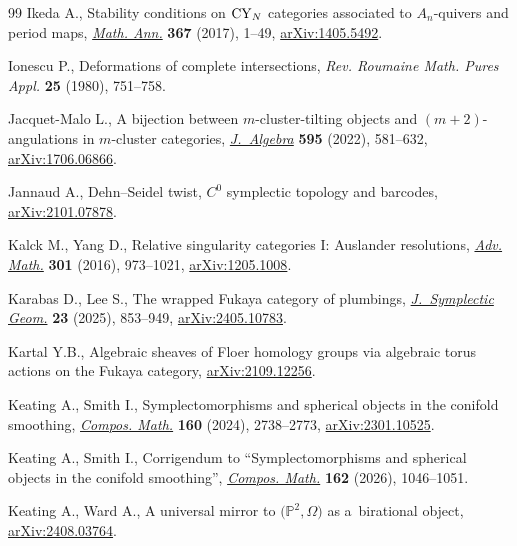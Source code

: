 \documentclass[10pt,a4paper]{amsart}
\theoremstyle{definition}
\numberwithin{equation}{section}
\begin{document}
\begin{thebibliography}{99}
Ikeda A., Stability conditions on {${\rm CY}_N$} categories associated to
 {$A_n$}-quivers and period maps,
 \href{https://doi.org/10.1007/s00208-016-1375-4}{\textit{Math. Ann.}}
 \textbf{367} (2017), 1--49,
 \href{http://arxiv.org/abs/1405.5492}{arXiv:1405.5492}.

Ionescu P., Deformations of complete intersections, \textit{Rev. Roumaine Math.
 Pures Appl.} \textbf{25} (1980), 751--758.

Jacquet-Malo L., A bijection between {$m$}-cluster-tilting objects and
 {$(m+2)$}-angulations in {$m$}-cluster categories,
 \href{https://doi.org/10.1016/j.jalgebra.2021.11.041}{\textit{J.~Algebra}}
 \textbf{595} (2022), 581--632,
 \href{http://arxiv.org/abs/1706.06866}{arXiv:1706.06866}.

Jannaud A., Dehn--{S}eidel twist, ${C}^0$ symplectic topology and barcodes,
 \href{http://arxiv.org/abs/2101.07878}{arXiv:2101.07878}.

Kalck M., Yang D., Relative singularity categories {I}: {A}uslander
 resolutions, \href{https://doi.org/10.1016/j.aim.2016.06.011}{\textit{Adv.
 Math.}} \textbf{301} (2016), 973--1021,
 \href{http://arxiv.org/abs/1205.1008}{arXiv:1205.1008}.

Karabas D., Lee S., The wrapped {F}ukaya category of plumbings,
 \href{https://doi.org/10.4310/jsg.250820172316}{\textit{J.~Symplectic Geom.}}
 \textbf{23} (2025), 853--949,
 \href{http://arxiv.org/abs/2405.10783}{arXiv:2405.10783}.

Kartal Y.B., Algebraic sheaves of {F}loer homology groups via algebraic torus
 actions on the {F}ukaya category,
 \href{http://arxiv.org/abs/2109.12256}{arXiv:2109.12256}.

Keating A., Smith I., Symplectomorphisms and spherical objects in the conifold
 smoothing, \href{https://doi.org/10.1112/S0010437X24007425}{\textit{Compos.
 Math.}} \textbf{160} (2024), 2738--2773,
 \href{http://arxiv.org/abs/2301.10525}{arXiv:2301.10525}.

Keating A., Smith I., Corrigendum to ``Symplectomorphisms and spherical objects
 in the conifold smoothing'',
 \href{https://doi.org/10.1017/S0010437X26103297}{\textit{Compos. Math.}}
 \textbf{162} (2026), 1046--1051.

Keating A., Ward A., A universal mirror to $\bigl(\mathbb{P}^2,\Omega\bigr)$ as
 a~birational object,
 \href{http://arxiv.org/abs/2408.03764}{arXiv:2408.03764}.


\end{thebibliography}
\end{document}
